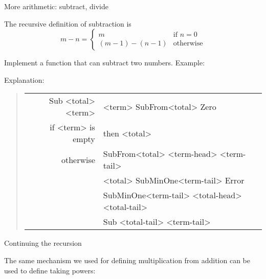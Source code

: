  {More arithmetic: subtract, divide}

\def\Sub#1#2{#1{\SubFrom{#2}}{#2}}
\def\SubFrom#1#2#3{#1{\SubMinOne{#3}}\Error}
\def\SubMinOne#1#2#3{\Sub{#1}{#3}}

The recursive definition of subtraction is
\[ m-n=\left\{\begin{array}{ll}m&\mbox{if $n=0$}\\
    (m-1)-(n-1)&\mbox{otherwise}\end{array}\right. \]
\begin{594exercise}
Implement a function  that can subtract two numbers.
Example:
\begin{logix}
\ttest{Subtraction}{\Sub\Three\Five}
\end{logix}
\end{594exercise}
\begin{answer}
\begin{inputwithcode}
\def\Sub#1#2{#1{\SubFrom{#2}}{#2}}
\def\SubFrom#1#2#3{#1{\SubMinOne{#3}}\Error}
\def\SubMinOne#1#2#3{\Sub{#1}{#3}}
\end{inputwithcode}
Explanation:
\begin{quote}\begin{ttfamily}\begin{tabular}{r@{$\Rightarrow$}l}
Sub <total> <term> & <term> SubFrom{<total>} Zero\\
if <term> is empty & then <total>\\
otherwise &SubFrom<total> <term-head> <term-tail>\\
&<total> SubMinOne<term-tail> Error\\
&SubMinOne<term-tail> <total-head> <total-tail>\\
&Sub <total-tail> <term-tail>
\end{tabular}\end{ttfamily}\end{quote}
\end{answer}

 {Continuing the recursion}

The same mechanism we used for defining multiplication from addition
can be used to define taking powers:
\begin{inputwithcode}
\def\ToThePower#1#2{%
  \IsOne{#1}{#2}{%
    \MultiplyBy{#2}{\ToThePower{\SubOne{#1}}{#2}}}}
\end{inputwithcode}
\begin{logix}
\end{logix}

